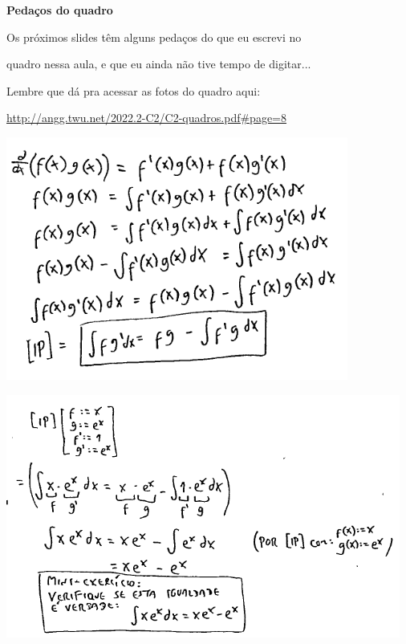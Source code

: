 \documentclass[oneside,12pt]{article}
\begin{document}
\newpage

{\bf Pedaços do quadro}

Os próximos slides têm alguns pedaços do que eu escrevi no

quadro nessa aula, e que eu ainda não tive tempo de digitar...

Lembre que dá pra acessar as fotos do quadro aqui:

\ssk

{\footnotesize

\url{http://angg.twu.net/2022.2-C2/C2-quadros.pdf\#page=8}

}



\newpage

\includegraphics[height=8cm]{2022-2-C2/int_partes_0.pdf}

\includegraphics[height=8cm]{2022-2-C2/int_partes_1.pdf}
\end{document}
